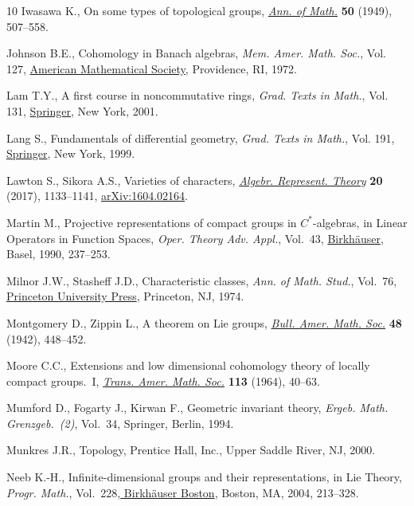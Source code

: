 \begin{thebibliography}{10}
Iwasawa K., On some types of topological groups, \href{https://doi.org/10.2307/1969548}{\textit{Ann. of Math.}}
 \textbf{50} (1949), 507--558.

Johnson B.E., Cohomology in {B}anach algebras, \textit{Mem. Amer. Math. Soc.},
 Vol. 127, \href{https://doi.org/10.1090/memo/0127}{American Mathematical Society}, Providence, RI, 1972.

Lam T.Y., A first course in noncommutative rings, \textit{Grad. Texts in
 Math.}, Vol. 131, \href{https://doi.org/10.1007/978-1-4419-8616-0}{Springer}, New York, 2001.

Lang S., Fundamentals of differential geometry, \textit{Grad. Texts in Math.},
 Vol. 191, \href{https://doi.org/10.1007/978-1-4612-0541-8}{Springer}, New York, 1999.

Lawton S., Sikora A.S., Varieties of characters, \href{https://doi.org/10.1007/s10468-017-9679-y}{\textit{Algebr. Represent.
 Theory}} \textbf{20} (2017), 1133--1141, \href{https://arxiv.org/abs/1604.02164}{arXiv:1604.02164}.

Martin M., Projective representations of compact groups in {$C^*$}-algebras, in
 Linear {O}perators in {F}unction {S}paces, \textit{Oper. Theory Adv. Appl.},
 Vol.~43, \href{https://doi.org/10.1007/978-3-0348-7250-8_17}{Birkh\"auser}, Basel, 1990, 237--253.

Milnor J.W., Stasheff J.D., Characteristic classes, \textit{Ann. of Math.
 Stud.}, Vol.~76, \href{https://doi.org/10.1515/9781400881826}{Princeton University Press}, Princeton, NJ, 1974.

Montgomery D., Zippin L., A theorem on {L}ie groups, \href{https://doi.org/10.1090/S0002-9904-1942-07699-3}{\textit{Bull. Amer. Math.
 Soc.}} \textbf{48} (1942), 448--452.

Moore C.C., Extensions and low dimensional cohomology theory of locally compact
 groups.~{I}, \href{https://doi.org/10.2307/1994090}{\textit{Trans. Amer. Math. Soc.}} \textbf{113} (1964), 40--63.

Mumford D., Fogarty J., Kirwan F., Geometric invariant theory, \textit{Ergeb.
 Math. Grenzgeb.~(2)}, Vol.~34, Springer, Berlin, 1994.

Munkres J.R., Topology, Prentice Hall, Inc., Upper Saddle River, NJ, 2000.

Neeb K.-H., Infinite-dimensional groups and their representations, in Lie
 {T}heory, \textit{Progr. Math.}, Vol.~228,\href{https://doi.org/10.1007/978-0-8176-8192-0_2}{ Birkh\"auser Boston}, Boston, MA,
 2004, 213--328.


\end{thebibliography}
